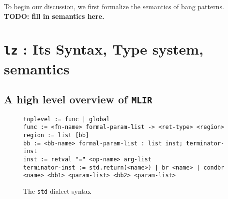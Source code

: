 \documentclass[sigplan,\review anonymous]{acmart}
\newcommand{\std}{\texttt{std} }
\newcommand{\mlir}{\texttt{MLIR} }
\newcommand{\lz}{\texttt{lz} }
\begin{document}
To begin our discussion, we first formalize the semantics of bang patterns.
\textbf{TODO: fill in semantics here.}
\section{\lz: Its Syntax, Type system, semantics}
\subsection{A high level overview of \mlir}

\begin{figure*}
\begin{verbatim}
toplevel := func | global
func := <fn-name> formal-param-list -> <ret-type> <region>
region := list [bb]
bb := <bb-name> formal-param-list : list inst; terminator-inst
inst := retval "=" <op-name> arg-list
terminator-inst := std.return(<name>) | br <name> | condbr <name> <bb1> <param-list> <bb2> <param-list>
\end{verbatim}
\caption{The \std dialect syntax}

\end{figure*}
\end{document}
